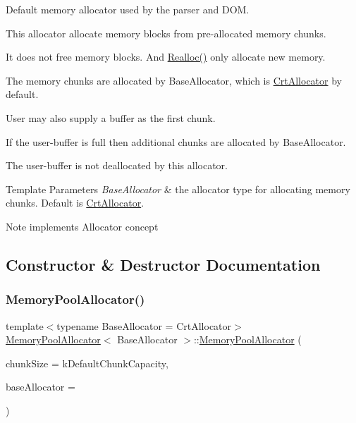 Default memory allocator used by the parser and D\+OM. 

This allocator allocate memory blocks from pre-\/allocated memory chunks.

It does not free memory blocks. And \hyperlink{classMemoryPoolAllocator_aba75280d42184b0ad414243f7f5ac6c7}{Realloc()} only allocate new memory.

The memory chunks are allocated by Base\+Allocator, which is \hyperlink{classCrtAllocator}{Crt\+Allocator} by default.

User may also supply a buffer as the first chunk.

If the user-\/buffer is full then additional chunks are allocated by Base\+Allocator.

The user-\/buffer is not deallocated by this allocator.


\begin{DoxyTemplParams}{Template Parameters}
{\em Base\+Allocator} & the allocator type for allocating memory chunks. Default is \hyperlink{classCrtAllocator}{Crt\+Allocator}. \\
\hline
\end{DoxyTemplParams}
\begin{DoxyNote}{Note}
implements Allocator concept 
\end{DoxyNote}


\subsection{Constructor \& Destructor Documentation}
\mbox{\label{classMemoryPoolAllocator_aeec85ac657f242ac5620115141be5209}} 
\subsubsection{\texorpdfstring{Memory\+Pool\+Allocator()}{MemoryPoolAllocator()}\hspace{0.1cm}{\footnotesize\ttfamily [1/4]}}
{\footnotesize\ttfamily template$<$typename Base\+Allocator = Crt\+Allocator$>$ \\
\hyperlink{classMemoryPoolAllocator}{Memory\+Pool\+Allocator}$<$ Base\+Allocator $>$\+::\hyperlink{classMemoryPoolAllocator}{Memory\+Pool\+Allocator} (\begin{DoxyParamCaption}\item[{size\+\_\+t}]{chunk\+Size = {\ttfamily kDefaultChunkCapacity},  }\item[{Base\+Allocator $\ast$}]{base\+Allocator = {} }\end{DoxyParamCaption})\hspace{0.3cm}{\ttfamily [inline]}}



